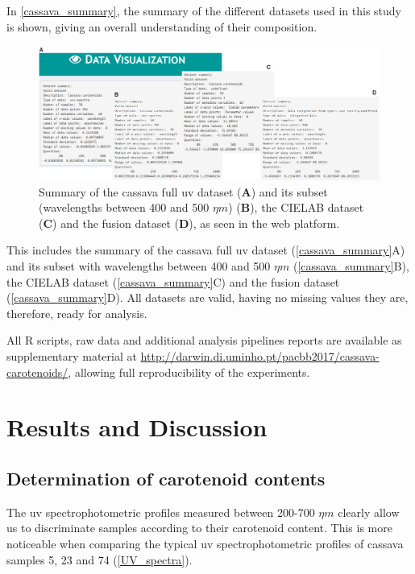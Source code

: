 In \autoref{cassava_summary}, the summary of the different datasets used in this study is shown, giving an overall understanding of their composition. 

\begin{figure}[H]
	\centering
	\includegraphics[width=1\linewidth]{Imagens/Case_study/summary_subset_full}
	\caption{Summary of the cassava full \gls{uv} dataset (\textbf{A}) and its subset (wavelengths between 400 and 500 $\eta m$) (\textbf{B}), the CIELAB dataset (\textbf{C}) and the fusion dataset (\textbf{D}), as seen in the web platform.}
	\label{cassava_summary}
\end{figure}

This includes the summary of the cassava full \gls{uv} dataset (\autoref{cassava_summary}A) and its subset with wavelengths between 400 and 500 $\eta m$ (\autoref{cassava_summary}B), the CIELAB dataset (\autoref{cassava_summary}C) and the fusion dataset (\autoref{cassava_summary}D). All datasets are valid, having no missing values they are, therefore, ready for analysis.

All R scripts, raw data and additional analysis pipelines reports are available as supplementary material at \href{http://darwin.di.uminho.pt/pacbb2017/cassava-carotenoids/}{http://darwin.di.uminho.pt/pacbb2017/cassava-carotenoids/}, allowing full reproducibility of the experiments.


\section{Results and Discussion}  \label{results}

\subsection{Determination of carotenoid contents} \label{color_content_subsec}

The \gls{uv} spectrophotometric profiles measured between 200-700 $\eta m$ clearly allow us to discriminate samples according to their carotenoid content. This is more noticeable when comparing the typical \gls{uv} spectrophotometric profiles of cassava samples 5, 23 and 74 (\autoref{UV_spectra}). 


